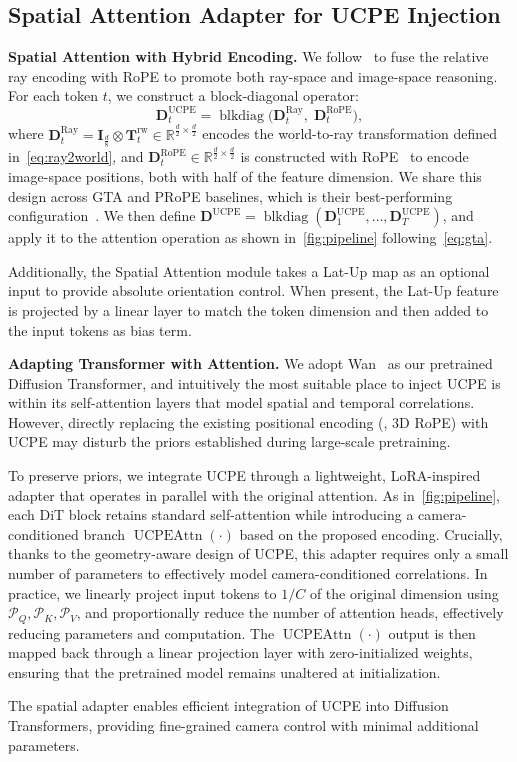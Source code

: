 \subsection{Spatial Attention Adapter for UCPE Injection}
\label{sec:adapter}

\noindent\textbf{Spatial Attention with Hybrid Encoding.}
We follow~\cite{li2025cameras} to fuse the relative ray encoding with RoPE to promote both ray-space and image-space reasoning.
For each token \(t\), we construct a block-diagonal operator:
\begin{equation}
\mathbf{D}^{\textrm{UCPE}}_t
= \operatorname{blkdiag}\!\big(
\mathbf{D}^{\textrm{Ray}}_t,\;
\mathbf{D}^{\textrm{RoPE}}_t
\big),
\label{eq:ucpe_block}
\end{equation}
where \(\mathbf{D}^{\textrm{Ray}}_t = \mathbf{I}_{\frac{d}{8}}\!\otimes\!\mathbf{T}^{\textrm{rw}}_t \in \mathbb{R}^{\frac{d}{2}\times\frac{d}{2}}\)
encodes the world-to-ray transformation defined in~\cref{eq:ray2world},
and \(\mathbf{D}^{\textrm{RoPE}}_t \in \mathbb{R}^{\frac{d}{2}\times\frac{d}{2}}\)
is constructed with RoPE~\cite{heo2024rotary} to encode image-space positions, both with half of the feature dimension.
We share this design across GTA and PRoPE baselines, which is their best-performing configuration~\cite{li2025cameras}.
We then define \(\mathbf{D}^{\textrm{UCPE}}=\operatorname{blkdiag}(\mathbf{D}^{\textrm{UCPE}}_1,\ldots,\mathbf{D}^{\textrm{UCPE}}_T)\),
and apply it to the attention operation as shown in~\cref{fig:pipeline} following~\cref{eq:gta}.

Additionally, the Spatial Attention module takes a Lat-Up map as an optional input to provide absolute orientation control.
When present, the Lat-Up feature %
is projected by a linear layer to match the token dimension and then added to the input tokens as bias term.

\noindent\textbf{Adapting Transformer with Attention.}
We adopt Wan~\cite{wan2025wan} as our pretrained Diffusion Transformer, and intuitively the most suitable place to inject UCPE is within its self-attention layers that model spatial and temporal correlations.
However, directly replacing the existing positional encoding (\eg, 3D RoPE) with UCPE may disturb the priors established during large-scale pretraining. 

To preserve priors, we integrate UCPE through a lightweight, LoRA-inspired adapter that operates in parallel with the original attention. 
As in~\cref{fig:pipeline}, each DiT block retains standard self-attention while introducing a camera-conditioned branch \(\operatorname{UCPEAttn}(\cdot)\) based on the proposed encoding.
Crucially, thanks to the geometry-aware design of UCPE, this adapter requires only a small number of parameters to effectively model camera-conditioned correlations. 
In practice, we linearly project input tokens to \(1/C\) of the original dimension using \(\mathcal{P}_{Q}, \mathcal{P}_{K}, \mathcal{P}_{V}\), and proportionally reduce the number of attention heads, effectively reducing parameters and computation.
The \(\operatorname{UCPEAttn}(\cdot)\) output is then mapped back through a linear projection layer with zero-initialized weights, ensuring that the pretrained model remains unaltered at initialization.

The spatial adapter enables efficient integration of UCPE into Diffusion Transformers, providing fine-grained camera control with minimal additional parameters.
